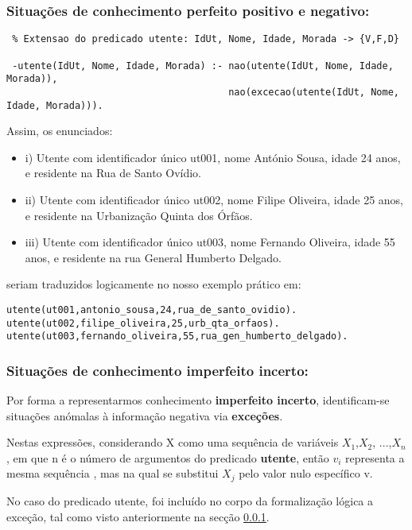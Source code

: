 \documentclass[
  oneside,
  10pt, a4paper,
  footinclude=true,
  headinclude=true,
  cleardoublepage=empty
]{scrbook}
\begin{document}
\subsubsection{\textbf{Situações de conhecimento perfeito positivo e negativo:}}
\label{pred_utente}
\begin{lstlisting}
 % Extensao do predicado utente: IdUt, Nome, Idade, Morada -> {V,F,D}
 
 -utente(IdUt, Nome, Idade, Morada) :- nao(utente(IdUt, Nome, Idade, Morada)),
                                       nao(excecao(utente(IdUt, Nome, Idade, Morada))).
\end{lstlisting}

Assim, os enunciados: 
\begin{itemize}
\item i) Utente com identificador único ut001, nome António Sousa, idade 24 anos, e residente na Rua de Santo Ovídio.
\item ii) Utente com identificador único ut002, nome Filipe Oliveira, idade 25 anos, e residente na Urbanização Quinta dos Órfãos.
\item iii) Utente com identificador único ut003, nome Fernando Oliveira, idade 55 anos, e residente na rua General Humberto Delgado.
\end{itemize}

seriam traduzidos logicamente  no nosso exemplo prático em:
\begin{lstlisting}
utente(ut001,antonio_sousa,24,rua_de_santo_ovidio).
utente(ut002,filipe_oliveira,25,urb_qta_orfaos).
utente(ut003,fernando_oliveira,55,rua_gen_humberto_delgado).
\end{lstlisting}


\subsubsection{\textbf{Situações de conhecimento imperfeito incerto:}}

Por forma a representarmos conhecimento \textbf{imperfeito incerto}, identificam-se situações anómalas à informação negativa via \textbf{exceções}.\par 
Nestas expressões, considerando X como uma sequência de variáveis $X_{1}$,$X_{2}$, ...,$X_{n}$, em que n é o número de argumentos do predicado \textbf{utente}, então $v_{i}$ representa a mesma sequência , mas na qual se substitui $X_{j}$ pelo valor nulo específico v.\par No caso do predicado utente, foi incluído no corpo da formalização lógica a exceção, tal como visto anteriormente na secção \ref{pred_utente}.\par 
\end{document}
